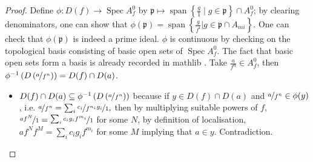 \documentclass[a4paper,UKenglish,cleveref, autoref, thm-restate]{lipics-v2021}
\begin{document}
\begin{proof}
    Define $\phi: D(f) \to\operatorname{Spec}A^0_f$ by
    $\mathfrak{p}\mapsto\operatorname{span}\left\{\frac{g}1\mid g\in\mathfrak{p}\right\}\cap A^0_f$; by clearing denominators, one can show that $\phi(\mathfrak{p})=\operatorname{span}\left\{\frac g{f^i}|g\in \mathfrak p\cap A_{mi}\right\}$. One can check that $\phi(\mathfrak{p})$ is indeed a prime ideal.
        $\phi$ is continuous by checking on the topological basis consisting of basic open sets of $\operatorname{Spec}A^0_f$. The fact that basic open sets form a basis is already recorded in \textsf{mathlib} \cite{mathlibrepo}. Take $\frac{a}{f^n}\in A^0_f$, then $\phi^{-1}\left(D\left(\nicefrac a{f^n}\right)\right)=D(f)\cap D(a)$. 
        \begin{itemize}
            \item $D(f)\cap D(a)\subseteq \phi^{-1}\left(D\left(\nicefrac a{f^n}\right)\right)$ because if $y\in D(f)\cap D(a)$ and $\nicefrac a{f^n}\in \phi(y)$, i.e.
            $
            \nicefrac a{f^n}=\sum_i \nicefrac{c_i}{f^{n_i}}\nicefrac{g_i}1,
            $
            then by multiplying suitable powers of $f$,
            $
            \nicefrac{a f^N}1=\nicefrac{\sum_i c_ig_if^{m_i}}1
            $ for some $N$, by definition of localisation, $af^N f^M=\sum_i c_i g_i f^{m_i}$ for some $M$ implying that $a\in y$. Contradiction.

\end{itemize}
\end{proof}
\end{document}
